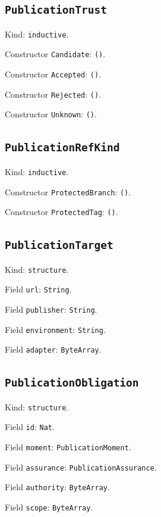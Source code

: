 \documentclass[11pt]{article}
\begin{document}
\subsection*{\texttt{PublicationTrust}}
\noindent Kind: \texttt{inductive}.\par
\noindent Constructor \texttt{Candidate}: \texttt{()}.\par
\noindent Constructor \texttt{Accepted}: \texttt{()}.\par
\noindent Constructor \texttt{Rejected}: \texttt{()}.\par
\noindent Constructor \texttt{Unknown}: \texttt{()}.\par
\subsection*{\texttt{PublicationRefKind}}
\noindent Kind: \texttt{inductive}.\par
\noindent Constructor \texttt{ProtectedBranch}: \texttt{()}.\par
\noindent Constructor \texttt{ProtectedTag}: \texttt{()}.\par
\subsection*{\texttt{PublicationTarget}}
\noindent Kind: \texttt{structure}.\par
\noindent Field \texttt{url}: \texttt{String}.\par
\noindent Field \texttt{publisher}: \texttt{String}.\par
\noindent Field \texttt{environment}: \texttt{String}.\par
\noindent Field \texttt{adapter}: \texttt{ByteArray}.\par
\subsection*{\texttt{PublicationObligation}}
\noindent Kind: \texttt{structure}.\par
\noindent Field \texttt{id}: \texttt{Nat}.\par
\noindent Field \texttt{moment}: \texttt{PublicationMoment}.\par
\noindent Field \texttt{assurance}: \texttt{PublicationAssurance}.\par
\noindent Field \texttt{authority}: \texttt{ByteArray}.\par
\noindent Field \texttt{scope}: \texttt{ByteArray}.\par
\end{document}
